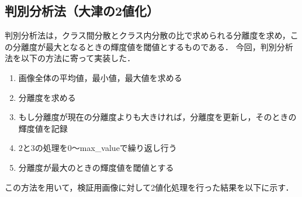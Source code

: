 \documentclass{jsarticle}
\begin{document}
\subsection{判別分析法（大津の2値化）}
判別分析法は，クラス間分散とクラス内分散の比で求められる分離度を求め，この分離度が最大となるときの輝度値を閾値とするものである．
今回，判別分析法を以下の方法に寄って実装した．
\begin{enumerate}
  \item 画像全体の平均値，最小値，最大値を求める
  \item 分離度を求める
  \item もし分離度が現在の分離度よりも大きければ，分離度を更新し，そのときの輝度値を記録
  \item 2と3の処理を0〜max\_valueで繰り返し行う
  \item 分離度が最大のときの輝度値を閾値とする
\end{enumerate}
この方法を用いて，検証用画像に対して2値化処理を行った結果を以下に示す．
\end{document}
